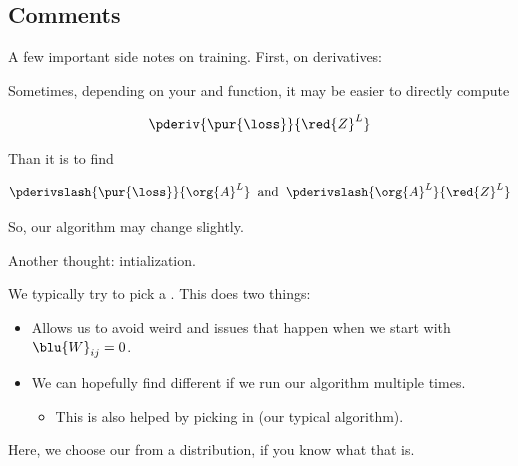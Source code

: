     \subsection{Comments}
    
        A few important side notes on training. First, on derivatives:\\
        
        \begin{concept}
            Sometimes, depending on your  and  function, it may be easier to directly compute
            
            \begin{equation*}
                \pderiv{ \pur{\loss} }{ \red{Z}^{L} }
            \end{equation*}
            
            Than it is to find 
            
            \begin{equation*}
                \pderivslash{ \pur{\loss} }{ \org{A}^L } 
                \;\;
                \text{and}
                \;\;
                \pderivslash{ \org{A}^L } { \red{Z}^{L} }
            \end{equation*}
            
            So, our algorithm may change slightly.
        \end{concept}
        
        Another thought: intialization.\\
        
        \begin{concept}
            We typically try to pick a . This does two things:
            
            \begin{itemize}
                \item Allows us to avoid weird  and  issues that happen when we start with $\blu{W}_{ij}=0$.
                
                \item We can hopefully find different  if we run our algorithm multiple times.
                    \begin{itemize}
                        \item This is also helped by picking  in  (our typical algorithm).
                    \end{itemize}
            \end{itemize}
            
            Here, we choose our  from a  distribution, if you know what that is.
        \end{concept}
        
